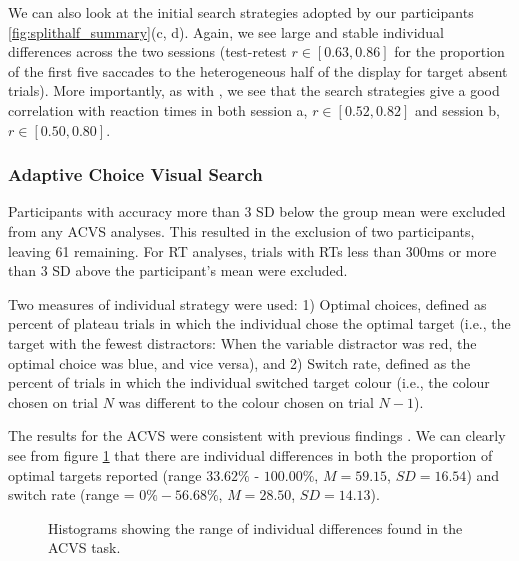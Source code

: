 \documentclass[]{rsos}%
\begin{document}
We can also look at the initial search strategies adopted by our participants \ref{fig:splithalf_summary}(c, d). Again, we see large and stable individual differences across the two sessions (test-retest $r \in [0.63, 0.86]$ for the proportion of the first five saccades to the heterogeneous half of the display for target absent trials). More importantly, as with \cite{nowakowska2017}, we see that the search strategies give a good correlation with reaction times in both session a, $r \in [0.52, 0.82]$ and session b, $r \in [0.50, 0.80]$.


\subsubsection{Adaptive Choice Visual Search}
 
Participants with accuracy more than 3 SD below the group mean were excluded from any ACVS analyses. This resulted in the exclusion of two participants, leaving 61 remaining. %
For RT analyses, trials with RTs less than 300ms or more than 3 SD above the participant's mean were excluded.
 
Two measures of individual strategy were used: 1) Optimal choices, defined as percent of plateau trials in which the individual chose the optimal target (i.e., the target with the fewest distractors: When the variable distractor was red, the optimal choice was blue, and vice versa), and 2) Switch rate, defined as the percent of trials in which the individual switched target colour (i.e., the colour chosen on trial $N$ was different to the colour chosen on trial $N-1$). 
  
The results for the ACVS were consistent with previous findings \cite{irons-leber2016,irons-leber2018}. We can clearly see from figure \ref{fig:acvs_summary} that there are individual differences in both the proportion of optimal targets reported (range $33.62\%$ - $100.00\%$, $M = 59.15$, $SD = 16.54$) and switch rate (range = $0\% - 56.68\%$, $M = 28.50$, $SD = 14.13$).

\begin{figure}
\centering
{}
\caption{Histograms showing the range of individual differences found in the ACVS task.}
\label{fig:acvs_summary}
\end{figure}
\end{document}
